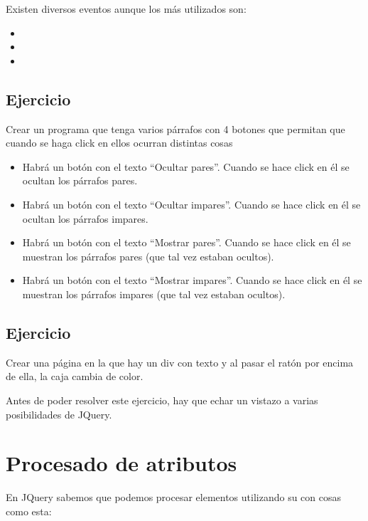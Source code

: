 \documentclass[letterpaper,10pt,spanish]{sphinxmanual}
\begin{document}
Existen diversos eventos aunque los más utilizados son:
\begin{itemize}
\item {} 

\item {} 

\item {} 

\end{itemize}


\subsection{Ejercicio}
\label{tema4:id5}
Crear un programa que tenga varios párrafos con 4 botones que permitan que cuando se haga click en ellos ocurran distintas cosas
\begin{itemize}
\item {} 
Habrá un botón con el texto ``Ocultar pares''. Cuando se hace click en él se ocultan los párrafos pares.

\item {} 
Habrá un botón con el texto ``Ocultar impares''. Cuando se hace click en él se ocultan los párrafos impares.

\item {} 
Habrá un botón con el texto ``Mostrar pares''. Cuando se hace click en él se muestran los párrafos pares (que tal vez estaban ocultos).

\item {} 
Habrá un botón con el texto ``Mostrar impares''. Cuando se hace click en él se muestran los párrafos impares (que tal vez estaban ocultos).

\end{itemize}


\subsection{Ejercicio}
\label{tema4:id6}
Crear una página en la que hay un div con texto y al pasar el ratón por encima de ella, la caja cambia de color.

Antes de poder resolver este ejercicio, hay que echar un vistazo a varias posibilidades de JQuery.


\section{Procesado de atributos}
\label{tema4:procesado-de-atributos}
En JQuery sabemos que podemos procesar elementos utilizando su  con cosas como esta:
\end{document}
